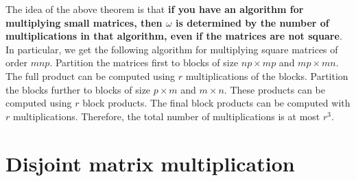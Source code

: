 \documentclass{article}
\theoremstyle{plain}
\theoremstyle{definition}
\theoremstyle{remark}
\begin{document}
The idea of the above theorem is that \textbf{if you have an algorithm for multiplying small matrices, then $\omega$ is determined by the number of multiplications in that algorithm, even if the matrices are not square}. In particular, we get the following algorithm for multiplying square matrices of order $mnp$. Partition the matrices first to blocks of size $np \times mp$ and $mp \times mn$. The full product can be computed using $r$ multiplications of the blocks. Partition the blocks further to blocks of size $p \times m$ and $m \times n$. These products can be computed using $r$ block products. The final block products can be computed with $r$ multiplications. Therefore, the total number of multiplications is at most $r^3$.

\newpage
\section{Disjoint matrix multiplication}
\end{document}
